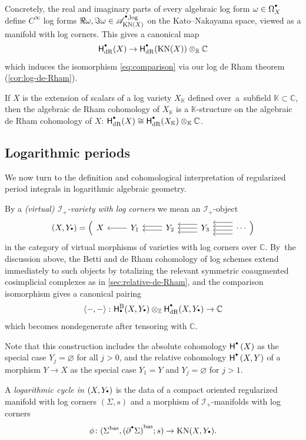 \documentclass[10pt]{amsart}
\let\oldbullet\bullet
\renewcommand{\bullet}{{\raisebox{1pt}{$\scriptscriptstyle\oldbullet$}}}
\theoremstyle{definition}
\theoremstyle{remark}
\newenvironment{remark}
  {\pushQED{\qed}\renewcommand{\qedsymbol}{$\lozenge$}\remarkx}
  {\popQED\endremarkx}
\let\defn\emph
\newcommand{\CC}{\mathbb{C}}
\newcommand{\KK}{\mathbb{K}}
\newcommand{\RR}{\mathbb{R}}
\newcommand{\ZZ}{\mathbb{Z}}
\newcommand{\rbrac}[1]{\left(#1\right)}
\newcommand{\abrac}[1]{\left\langle#1\right\rangle}
\newcommand{\cAlog}[2][\bullet]{\mathscr{A}^{#1,\log}_{#2}}
\newcommand{\Sig}{\Sigma}
\newcommand{\bas}[1]{{#1}^{\mathrm{bas}}}
\newcommand{\Sigbas}{\bas{\Sig}}
\newcommand{\bdSig}[1][]{\partial^{#1}\Sigma}
\newcommand{\KN}[1]{\mathrm{KN}(#1)}
\newcommand{\coH}[2][\bullet]{\mathsf{H}^{#1}\rbrac{#2}}
\newcommand{\HdR}[2][\bullet]{\mathsf{H}_{\mathrm{dR}}^{#1}(#2)}
\newcommand{\HlgyB}[2][\bullet]{\mathsf{H}^{\mathrm{B}}_{#1}(#2)}
\newcommand{\forms}[2][\bullet]{\Omega^{#1}_{#2}}
\newcommand{\augsimp}[4]
{
\begin{tikzcd}[ampersand replacement=\&]
     #1 \& #2 \ar[l] \& #3
     \ar[l,shift left = 1]\ar[l,shift right=1] \& #4 \ar[l,shift left = 2]\ar[l,shift left = 0]\ar[l,shift left = -2] \& \ar[l,shift left = 3]\ar[l,shift left = 1]\ar[l,shift left = -1]\ar[l,shift left = -3] \cdots
    \end{tikzcd}
}
\newcommand{\ascat}{\mathscr{I}_+}
\begin{document}
Concretely, the real and imaginary parts of every algebraic log form $\omega \in \forms{X}$ define $C^\infty$ log forms $\Re \omega, \Im \omega \in \cAlog{\KN{X}}$ on the Kato--Nakayama space, viewed as a manifold with log corners. This gives a canonical map
\[
\HdR{X} \to \HdR{\KN{X}}\otimes_\RR \CC
\]
which induces the isomorphism \eqref{eq:comparison} via our log de Rham theorem (\autoref{cor:log-de-Rham}).

\begin{remark}\label{rmk:dR-over-K}
If $X$ is the extension of scalars of a log variety $X_\KK$ defined over~a~sub\-field $\KK\subset \CC$, then the algebraic de Rham cohomology of $X_\KK$ is a $\KK$-structure on the algebraic de Rham cohomology of $X$: $\HdR{X}\cong \HdR{X_\KK}\otimes_\KK\CC$.
\end{remark}

\subsection{Logarithmic periods}

We now turn to the definition and cohomological interpretation of regularized period integrals in logarithmic algebraic geometry.

By a \defn{(virtual) $\ascat$-variety with log corners} we mean an $\ascat$-object
\[
(X,Y_\bullet) = \rbrac{\augsimp{X}{Y_1}{Y_2}{Y_3}}
\]
in the category of virtual morphisms of varieties with log corners over $\CC$. By~the discussion above, the Betti and de Rham cohomology of log schemes extend immediately to such objects by totalizing the relevant symmetric coaugmented cosimplicial complexes as in \autoref{sec:relative-de-Rham}, and the comparison isomorphism gives a canonical pairing
\begin{equation}\label{eq:BdR-pairing-diagrams-varieties-log-corners}
\abrac{-,-} \colon \HlgyB{X,Y_\bullet} \otimes_\ZZ \HdR{X,Y_\bullet} \to \CC
\end{equation}
which becomes nondegenerate after tensoring with $\CC$.

Note that this construction includes the absolute cohomology $\coH{X}$ as the special case $Y_j = \varnothing$ for all $j > 0$, and the relative cohomology $\coH{X,Y}$ of a morphism $Y\to X$ as the special case $Y_1=Y$ and $Y_j = \varnothing$ for $j > 1$.

\begin{definition}\label{def:log-cycle}
A \defn{logarithmic cycle in $(X,Y_\bullet)$} is the data of a compact oriented regularized manifold with log corners $(\Sig,s)$ and a morphism of $\ascat$-manifolds with log corners
\[
\phi \colon (\Sigbas,\bas{(\bdSig[\bullet])};s) \to \KN{X,Y_\bullet}.
\]
\end{definition}
\end{document}

